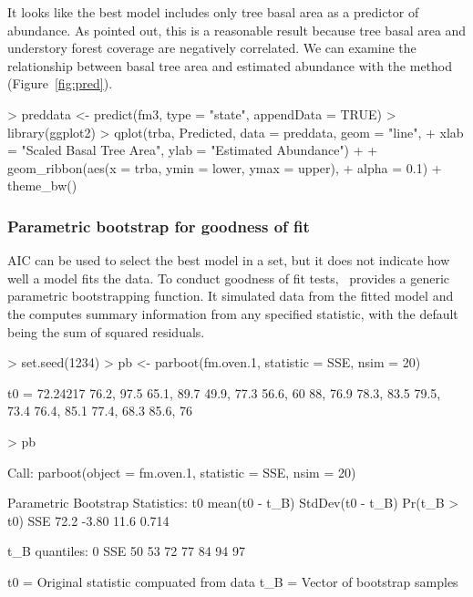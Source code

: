 \documentclass[article,shortnames]{jss}
\newcommand{\um}{\pkg{unmarked}}
\begin{document}
It looks like the best model includes only tree basal area as a
predictor of abundance.  As \citet{Royle2004a} pointed out, this is a
reasonable result because tree basal area and understory forest
coverage are negatively correlated.  We can examine the relationship
between basal tree area and estimated abundance
with the  method (Figure~\ref{fig:pred}).



\begin{Schunk}
\begin{Sinput}
> preddata <- predict(fm3, type = "state", appendData = TRUE)
> library(ggplot2)
> qplot(trba, Predicted, data = preddata, geom = "line", 
+     xlab = "Scaled Basal Tree Area", ylab = "Estimated Abundance") + 
+     geom_ribbon(aes(x = trba, ymin = lower, ymax = upper), 
+         alpha = 0.1) + theme_bw()
\end{Sinput}
\end{Schunk}



\subsubsection{Parametric bootstrap for goodness of fit}

AIC can be used to select the best model in a set, but it does not indicate
how well a model fits the data.  
To conduct goodness of fit tests, \um\ provides a generic
parametric bootstrapping function.  It simulated data from the fitted
model and the computes summary information from any specified
statistic, with the default being the sum of squared residuals.

\begin{Schunk}
\begin{Sinput}
> set.seed(1234)
> pb <- parboot(fm.oven.1, statistic = SSE, nsim = 20)
\end{Sinput}
\begin{Soutput}
t0 = 72.24217 
76.2, 97.5
65.1, 89.7
49.9, 77.3
56.6, 60
88, 76.9
78.3, 83.5
79.5, 73.4
76.4, 85.1
77.4, 68.3
85.6, 76
\end{Soutput}
\end{Schunk}
\begin{Schunk}
\begin{Sinput}
> pb
\end{Sinput}
\begin{Soutput}
Call: parboot(object = fm.oven.1, statistic = SSE, nsim = 20)

Parametric Bootstrap Statistics:
      t0 mean(t0 - t_B) StdDev(t0 - t_B) Pr(t_B > t0)
SSE 72.2          -3.80             11.6        0.714

t_B quantiles:
    0% 2.5% 25% 50% 75% 97.5% 100%
SSE 50   53  72  77  84    94   97

t0 = Original statistic compuated from data
t_B = Vector of bootstrap samples
\end{Soutput}
\end{Schunk}
\end{document}
